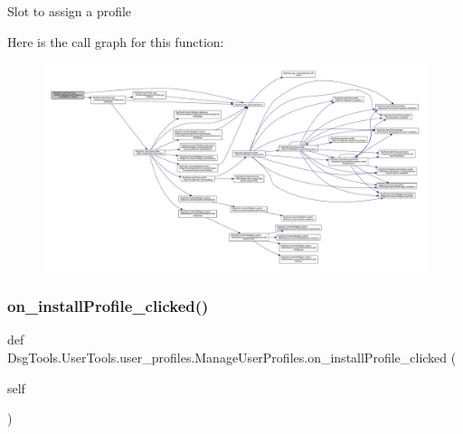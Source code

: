\begin{DoxyVerb}Slot to assign a profile
\end{DoxyVerb}
 Here is the call graph for this function\+:
\nopagebreak
\begin{figure}[H]
\begin{center}
\leavevmode
\includegraphics[width=350pt]{class_dsg_tools_1_1_user_tools_1_1user__profiles_1_1_manage_user_profiles_a21c06c53c95cc88bc49c7bb4dc6bfcc3_cgraph}
\end{center}
\end{figure}
\mbox{\label{class_dsg_tools_1_1_user_tools_1_1user__profiles_1_1_manage_user_profiles_a026d117030c803f78c6d5896e7a090ac}} 
\subsubsection{\texorpdfstring{on\+\_\+install\+Profile\+\_\+clicked()}{on\_installProfile\_clicked()}}
{\footnotesize\ttfamily def Dsg\+Tools.\+User\+Tools.\+user\+\_\+profiles.\+Manage\+User\+Profiles.\+on\+\_\+install\+Profile\+\_\+clicked (\begin{DoxyParamCaption}\item[{}]{self }\end{DoxyParamCaption})}

